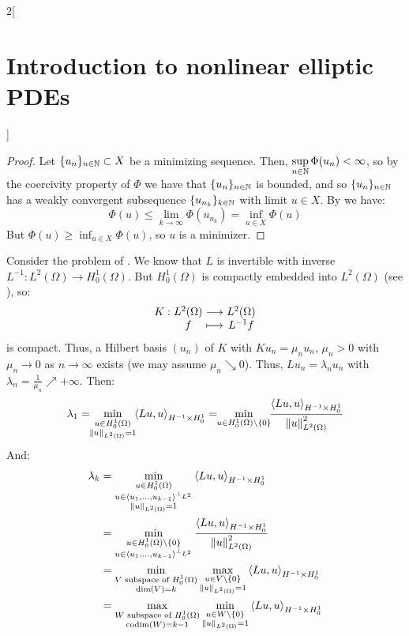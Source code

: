 \documentclass[../../../main_math.tex]{subfiles}
\begin{document}
\begin{multicols}{2}[\section{Introduction to nonlinear elliptic PDEs}]
\begin{proof}
    Let $\{u_n\}_{n\in\mathbb{N}}\subset X$ be a minimizing sequence. Then, $\displaystyle\sup_{n\in\mathbb{N}}\Phi(u_n)<\infty$, so by the coercivity property of $\Phi$ we have that $\{u_n\}_{n\in\mathbb{N}}$ is bounded, and so $\{u_n\}_{n\in\mathbb{N}}$ has a weakly convergent subsequence $\{u_{n_k}\}_{k\in\mathbb{N}}$ with limit $u\in X$. By  we have:
    $$
      \Phi(u)\leq \lim_{k\to\infty}\Phi(u_{n_k})=\inf_{u\in X}\Phi(u)
    $$
    But $\displaystyle\Phi(u)\geq \inf_{u\in X}\Phi(u)$, so $u$ is a minimizer.
  \end{proof}
  \begin{theorem}
    Consider the problem of . We know that $L$ is invertible with inverse $L^{-1}:L^2(\Omega)\to H_0^1(\Omega)$. But $H_0^1(\Omega)$ is compactly embedded into $L^2(\Omega)$ (see ), so:
    $$
      \function{K}{L^2(\Omega)}{L^2(\Omega)}{f}{L^{-1}f}
    $$
    is compact. Thus, a Hilbert basis $(u_n)$ of $K$ with $Ku_n=\mu_n u_n$, $\mu_n>0$ with $\mu_n\to 0$ as $n\to\infty$ exists (we may assume $\mu_n\searrow 0$). Thus, $Lu_n=\lambda_nu_n$ with $\lambda_n=\frac{1}{\mu_n}\nearrow+\infty$. Then:
    $$
      \lambda_1=\!\!\min_{\substack{u\in H_0^1(\Omega) \\ \norm{u}_{L^2(\Omega)}=1}}\!\!{\langle Lu,u\rangle}_{H^{-1}\times H_0^1}=\!\!\min_{u\in H_0^1(\Omega)\setminus\{0\}}\!\!\frac{{\langle Lu,u\rangle}_{H^{-1}\times H_0^1}}{\norm{u}_{L^2(\Omega)}^2}
    $$
    And:
    \begin{align*}
      \lambda_k & =\min_{\substack{u\in H_0^1(\Omega)                   \\u\in\langle u_1,\dots,u_{k-1}\rangle^{\perp_{L^2}}\\ \norm{u}_{L^2(\Omega)}=1}}{\langle Lu,u\rangle}_{H^{-1}\times H_0^1}\\
                & = \min_{\substack{u\in H_0^1(\Omega)\setminus\{0\}    \\ u\in\langle u_1,\dots,u_{k-1}\rangle^{\perp_{L^2}}}}\frac{{\langle Lu,u\rangle}_{H^{-1}\times H_0^1}}{\norm{u}_{L^2(\Omega)}^2}\\
                & =\min_{\substack{V\text{ subspace of }H_0^1(\Omega)   \\ \dim(V)=k}}\max_{\substack{u\in V\setminus\{0\} \\ \norm{u}_{L^2(\Omega)}=1}}{\langle Lu,u\rangle}_{H^{-1}\times H_0^1}\\
                & = \max_{\substack{W\text{ subspace of } H_0^1(\Omega) \\ \codim(W)=k-1}}\min_{\substack{u\in W\setminus\{0\} \\ \norm{u}_{L^2(\Omega)}=1}}{\langle Lu,u\rangle}_{H^{-1}\times H_0^1}

\end{align*}
\end{theorem}
\end{multicols}
\end{document}
